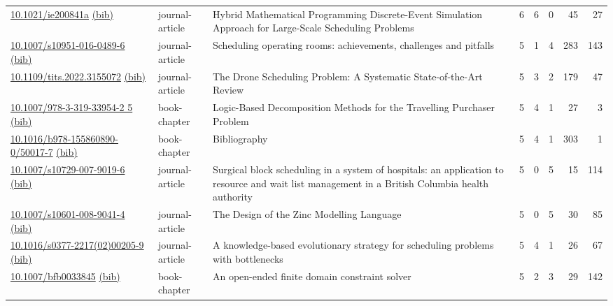 {\begin{longtable}{p{5cm}lp{11cm}rrrrr}
\href{http://dx.doi.org/10.1021/ie200841a}{10.1021/ie200841a} \href{https://www.doi2bib.org/bib/10.1021/ie200841a}{(bib)} & journal-article & Hybrid Mathematical Programming Discrete-Event Simulation Approach for Large-Scale Scheduling Problems & 6 & 6 & 0 & 45 & 27 \\
\href{http://dx.doi.org/10.1007/s10951-016-0489-6}{10.1007/s10951-016-0489-6} \href{https://www.doi2bib.org/bib/10.1007/s10951-016-0489-6}{(bib)} & journal-article & Scheduling operating rooms: achievements, challenges and pitfalls & 5 & 1 & 4 & 283 & 143 \\
\href{http://dx.doi.org/10.1109/tits.2022.3155072}{10.1109/tits.2022.3155072} \href{https://www.doi2bib.org/bib/10.1109/tits.2022.3155072}{(bib)} & journal-article & The Drone Scheduling Problem: A Systematic State-of-the-Art Review & 5 & 3 & 2 & 179 & 47 \\
\href{http://dx.doi.org/10.1007/978-3-319-33954-2_5}{10.1007/978-3-319-33954-2 5} \href{https://www.doi2bib.org/bib/10.1007/978-3-319-33954-2_5}{(bib)} & book-chapter & Logic-Based Decomposition Methods for the Travelling Purchaser Problem & 5 & 4 & 1 & 27 & 3 \\
\href{http://dx.doi.org/10.1016/b978-155860890-0/50017-7}{10.1016/b978-155860890-0/50017-7} \href{https://www.doi2bib.org/bib/10.1016/b978-155860890-0/50017-7}{(bib)} & book-chapter & Bibliography & 5 & 4 & 1 & 303 & 1 \\
\href{http://dx.doi.org/10.1007/s10729-007-9019-6}{10.1007/s10729-007-9019-6} \href{https://www.doi2bib.org/bib/10.1007/s10729-007-9019-6}{(bib)} & journal-article & Surgical block scheduling in a system of hospitals: an application to resource and wait list management in a British Columbia health authority & 5 & 0 & 5 & 15 & 114 \\
\href{http://dx.doi.org/10.1007/s10601-008-9041-4}{10.1007/s10601-008-9041-4} \href{https://www.doi2bib.org/bib/10.1007/s10601-008-9041-4}{(bib)} & journal-article & The Design of the Zinc Modelling Language & 5 & 0 & 5 & 30 & 85 \\
\href{http://dx.doi.org/10.1016/s0377-2217(02)00205-9}{10.1016/s0377-2217(02)00205-9} \href{https://www.doi2bib.org/bib/10.1016/s0377-2217(02)00205-9}{(bib)} & journal-article & A knowledge-based evolutionary strategy for scheduling problems with bottlenecks & 5 & 4 & 1 & 26 & 67 \\
\href{http://dx.doi.org/10.1007/bfb0033845}{10.1007/bfb0033845} \href{https://www.doi2bib.org/bib/10.1007/bfb0033845}{(bib)} & book-chapter & An open-ended finite domain constraint solver & 5 & 2 & 3 & 29 & 142 \\

\end{longtable}}
